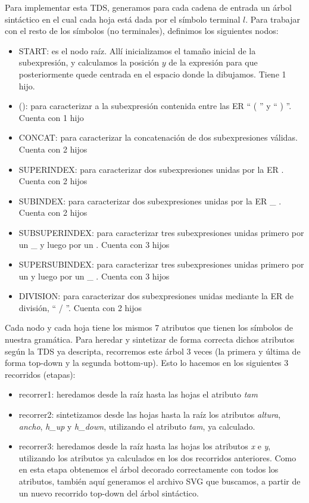 \documentclass[a4paper, 10pt, twoside]{article}
\begin{document}
Para implementar esta TDS, generamos para cada cadena de entrada un árbol sintáctico en el cual cada hoja está dada por el símbolo terminal $l$. Para trabajar con el resto de los símbolos (no terminales), definimos los siguientes nodos:
\begin{itemize} 
  \item START: es el nodo raíz. Allí inicializamos el tamaño inicial de la subexpresión, y calculamos la posición $y$ de la expresión para que posteriormente quede centrada en el espacio donde la dibujamos. Tiene 1 hijo.
  \item (): para caracterizar a la subexpresión contenida entre las ER `` ( '' y `` ) ''. Cuenta con 1 hijo
  \item CONCAT: para caracterizar la concatenación de dos subexpresiones válidas. Cuenta con 2 hijos
  \item SUPERINDEX: para caracterizar dos subexpresiones unidas por la ER \detokenize{^}. Cuenta con 2 hijos
  \item SUBINDEX: para caracterizar dos subexpresiones unidas por la ER \_ . Cuenta con 2 hijos
  \item SUBSUPERINDEX: para caracterizar tres subexpresiones unidas primero por un \_ y luego por un \detokenize{^}. Cuenta con 3 hijos
  \item SUPERSUBINDEX: para caracterizar tres subexpresiones unidas primero por un \detokenize{^} y luego por un \_ . Cuenta con 3 hijos
  \item DIVISION: para caracterizar dos subexpresiones unidas mediante la ER de división, `` / ''. Cuenta con 2 hijos
\end{itemize}

Cada nodo y cada hoja tiene los mismos 7 atributos que tienen los símbolos de nuestra gramática. Para heredar y sintetizar de forma correcta dichos atributos según la TDS ya descripta, recorremos este árbol 3 veces (la primera y última de forma top-down y la segunda bottom-up). Esto lo hacemos en los siguientes 3 recorridos (etapas):
\begin{itemize}
  \item recorrer1: heredamos desde la raíz hasta las hojas el atributo \emph{tam} 
  \item recorrer2: sintetizamos desde las hojas hasta la raíz los atributos \emph{altura}, \emph{ancho}, \emph{h\_up} y \emph{h\_down}, utilizando el atributo \emph{tam}, ya calculado.
  \item recorrer3: heredamos desde la raíz hasta las hojas los atributos \emph{x} e \emph{y}, utilizando los atributos ya calculados en los dos recorridos anteriores. Como en esta etapa obtenemos el árbol decorado correctamente con todos los atributos, también aquí generamos el archivo SVG que buscamos, a partir de un nuevo recorrido top-down del árbol sintáctico.
\end{itemize}
\end{document}
